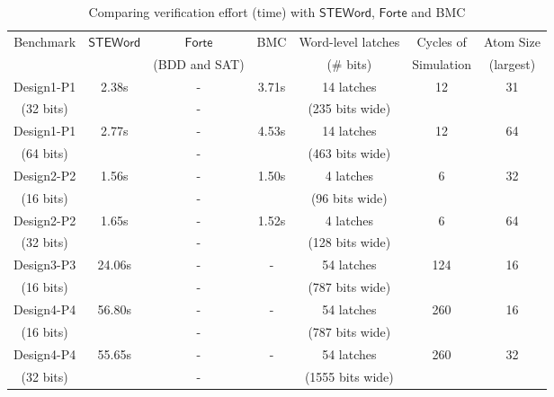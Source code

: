 \documentclass{llncs}
\newcommand{\steword}{\ensuremath{\mathsf{STEWord}}}
\newcommand{\forte}{\ensuremath{\mathsf{Forte}}}
\begin{document}
\begin{table}
\scriptsize
\begin{center}
\begin{tabular}{|c|c|c|c|c|c|c|}
\hline
Benchmark & {\steword} & {\forte}  & BMC & Word-level latches & Cycles of  & Atom Size \\
        &            & (BDD and SAT) &     & (\# bits)     & Simulation & (largest) \\
\hline
Design1-P1 & 2.38s                   & -                             & 3.71s & 14 latches & 12 & 31 \\
(32 bits)  &         & -                                   &  & (235 bits wide) & & \\
\hline
Design1-P1 & 2.77s                   & -                                   & 4.53s & 14 latches & 12 & 64 \\
(64 bits)  &         & -                                   &  & (463 bits wide) & & \\
\hline
Design2-P2 & 1.56s                   & -                             & 1.50s & 4 latches & 6 & 32\\
(16 bits)  &         & -                                   &  & (96 bits wide) & & \\
\hline
Design2-P2 & 1.65s                   & -                                   & 1.52s & 4 latches & 6 & 64\\
(32 bits)  &         & -                                   &  & (128 bits wide) & & \\
\hline
Design3-P3 & 24.06s                  & -                                   & - & 54 latches & 124 & 16 \\
(16 bits)  &         & -                                   &  & (787 bits wide) & & \\
\hline
Design4-P4 & 56.80s                  & -                                   & - & 54 latches & 260 & 16 \\
(16 bits)  &         & -                                   &  & (787 bits wide) & & \\
\hline
Design4-P4 & 55.65s                  & -                                   & - & 54 latches & 260 & 32 \\
(32 bits)  &         & -                                   &  & (1555 bits wide) & & \\
\hline
\end{tabular}
\end{center}
\caption{Comparing verification effort (time) with {\steword}, {\forte} and BMC}
\vspace*{-0.2in}
\label{compare-table}
\end{table}
\end{document}
